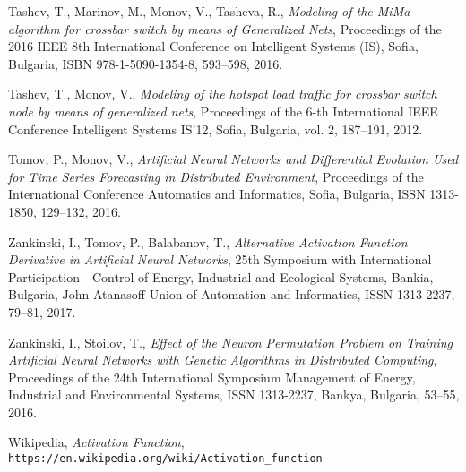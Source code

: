 \documentclass{llncs}
\begin{document}
\begin{thebibliography}{99}
 Tashev, T., Marinov, M., Monov, V., Tasheva, R., \textit{Modeling of the MiMa-algorithm for crossbar switch by means of Generalized Nets}, Proceedings of the 2016 IEEE 8th International Conference on Intelligent Systems (IS), Sofia, Bulgaria, ISBN 978-1-5090-1354-8, 593--598, 2016.

 Tashev, T., Monov, V., \textit{Modeling of the hotspot load traffic for crossbar switch node by means of generalized nets}, Proceedings of the 6-th International IEEE Conference Intelligent Systems IS'12, Sofia, Bulgaria, vol. 2, 187--191, 2012.

 Tomov, P., Monov, V., \textit{Artificial Neural Networks and Differential Evolution Used for Time Series Forecasting in Distributed Environment}, Proceedings of the International Conference Automatics and Informatics, Sofia, Bulgaria, ISSN 1313-1850, 129--132, 2016.

 Zankinski, I., Tomov, P., Balabanov, T., \textit{Alternative Activation Function Derivative in Artificial Neural Networks}, 25th Symposium with International Participation - Control of Energy, Industrial and Ecological Systems, Bankia, Bulgaria, John Atanasoff Union of Automation and Informatics, ISSN 1313-2237, 79--81, 2017.

 Zankinski, I., Stoilov, T., \textit{Effect of the Neuron Permutation Problem on Training Artificial Neural Networks with Genetic Algorithms in Distributed Computing}, Proceedings of the 24th International Symposium Management of Energy, Industrial and Environmental Systems, ISSN 1313-2237, Bankya, Bulgaria, 53--55, 2016.

  Wikipedia, \textit{Activation Function}, \\\texttt{https://en.wikipedia.org/wiki/Activation\_function}

\end{thebibliography}
\end{document}
